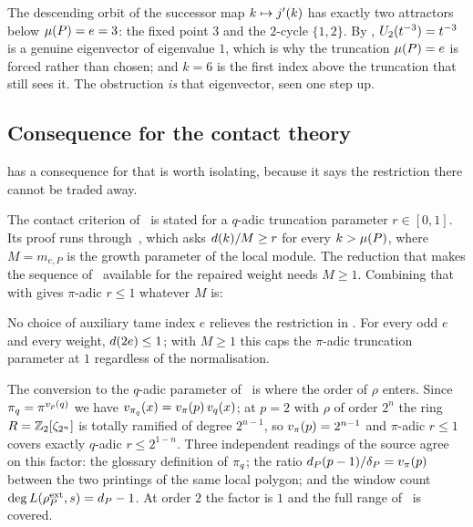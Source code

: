 \begin{remark}
\label{rem:orbit}
The descending orbit of the successor map $k \mapsto j'(k)$ has exactly two
attractors below $\mu(P) = e = 3$: the fixed point $3$ and the $2$-cycle
$\{1,2\}$. By , $U_2(t^{-3}) = t^{-3}$ is a genuine
eigenvector of eigenvalue $1$, which is why the truncation
$\mu(P) = e$ is forced rather than chosen; and $k = 6$ is the first index
above the truncation that still sees it. The obstruction \emph{is} that
eigenvector, seen one step up.
\end{remark}

\subsection{Consequence for the contact theory}
\label{sec:contact-cap}

 has a consequence for  that is worth
isolating, because it says the restriction there cannot be traded away.

The contact criterion of~\cite[Theorem 1.1]{kramermillerupton2021newton} is stated
for a $q$-adic truncation parameter $r \in [0,1]$. Its proof runs through~\cite[Definition 7.3(2)]{kramermillerupton2021newton}, which asks $d(k)/M \ge r$
for every $k > \mu(P)$, where $M = m_{e,P}$ is the growth parameter of the
local module. The reduction that makes the sequence of~\cite[\S6.2]{kramermillerupton2021newton} available for the repaired weight needs $M
\ge 1$. Combining that with  gives $\pi$-adic $r \le 1$
whatever $M$ is:

\begin{corollary}
\label{cor:cap-universal}
No choice of auxiliary tame index $e$ relieves the restriction in
. For every odd $e$ and every weight, $d(2e) \le 1$;
with $M \ge 1$ this caps the $\pi$-adic truncation parameter at $1$
regardless of the normalisation.
\end{corollary}

The conversion to the $q$-adic parameter of~\cite[Theorem 1.1]{kramermillerupton2021newton} is where the order of $\rho$ enters.
Since $\pi_q = \pi^{v_p(q)}$ we have $v_{\pi_q}(x) = v_{\pi}(p)\,v_q(x)$; at $p =
2$ with $\rho$ of order $2^n$ the ring $R = \mathbb{Z}_2[\zeta_{2^n}]$ is totally
ramified of degree $2^{n-1}$, so $v_{\pi}(p) = 2^{n-1}$ and $\pi$-adic $r \le
1$ covers exactly $q$-adic $r \le 2^{1-n}$. Three independent readings of
the source agree on this factor: the glossary definition of $\pi_q$; the
ratio $d_P(p-1)/\delta_P = v_{\pi}(p)$ between the two printings of the same
local polygon; and the window count $\deg L(\rho_P^{\mathrm{ext}},s) = d_P - 1$. At order
$2$ the factor is $1$ and the full range of~\cite[Theorem 1.1]{kramermillerupton2021newton} is covered.

